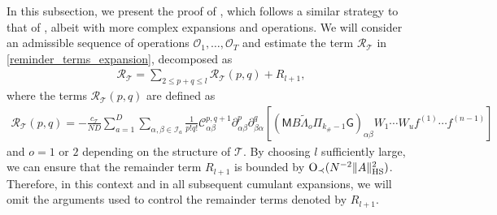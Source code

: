 \documentclass[10pt,reqno]{amsart}
\numberwithin{equation}{section}
\numberwithin{figure}{section}
\theoremstyle{plain} %
\theoremstyle{definition} %
\newtheorem{remark}[theorem]{Remark}
\newcommand{\wt}{\widetilde}
\renewcommand{\txt}[1]{\text{\rm{#1}}}
\newcommand{\cor}{\color{darkred}}
\newcommand{\cT}{\mathcal T}
\newcommand{\cI}{\mathcal{I}}
\newcommand{\cC}{\mathcal{C}}
\newcommand{\cR}{{\mathcal R}}
\newcommand{\cO}{{\mathcal{O}}}
\newcommand{\sG}{\mathsf G}
\newcommand{\sM}{\mathsf M}
\renewcommand{\leq}{\le}
\newcommand{\p}[1]{({#1})}
\newcommand{\pa}[1]{\left({#1}\right)}
\newcommand{\qa}[1]{\left[{#1}\right]}
\newcommand{\norm}[1]{\lVert #1 \rVert}
\newcommand{\tLambda}{{\wt{\Lambda}}}
\newcommand{\OO}{\mathrm{O}}
\newcommand{\HS}{\txt{HS}}
\newcommand{\iab}{\alpha\beta}
\newcommand{\iba}{\beta\alpha}
\newcommand{\opr}[1]{\mathrm{O}_\prec\left({#1}\right)}
\numberwithin{equation}{section}
\begin{document}
In this subsection, we present the proof of , which follows a similar strategy to that of , albeit with more complex expansions and operations. 
We will consider an admissible sequence of operations $\cO_1,\ldots,\cO_T$
and estimate the term $\cR_{\cT}$ in \eqref{reminder_terms_expansion},  decomposed as
\begin{equation}\nonumber
    \begin{aligned}
        \cR_{\cT}=\sum_{2\leq p+q \leq l}\cR_{\cT}\pa{p,q}+R_{l+1},
    \end{aligned}
\end{equation}
where the terms $ \cR_{\cT}\pa{p,q}$ are defined as 
\begin{equation}\label{explicit_reminder_terms_before_expansions}
    \begin{aligned}
        \cR_{\cT}\pa{p,q}=-\frac{c_{\cT}}{ND}\sum_{a=1}^D\sum_{\alpha,\beta\in \cI_a}\frac{1}{p!q!}\cC_{\iab}^{p,q+1}\partial_{\iab}^p\partial_{\iba}^q\qa{\p{\sM B \tLambda_o \Pi_{k_{\#}-1}\sG}_{\iab} W_1 \cdots W_u f^{(1)} \cdots f^{(n-1)}}
    \end{aligned}
\end{equation}
and $o=1$ or $2$ depending on the structure of $\cT$. By choosing $l$ sufficiently large, we can ensure that the remainder term \(R_{l+1}\) is bounded by $\OO_{\prec}\p{N^{-2}\norm{A}_{\HS}^2}$. Therefore, in this context and in all subsequent cumulant expansions, we will omit the arguments used to control the remainder terms denoted by $R_{l+1}$.

%

\end{document}
